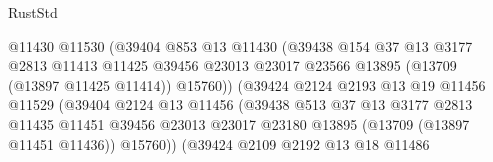 \begin{lexlean}{RustStd}
\begin{coremodule}
                                      @11430
                                      @11530
                                      (@39404
                                        @853
                                        @13
                                        @11430
                                        (@39438
                                          @154
                                          @37
                                          @13
                                          @3177
                                          @2813
                                          @11413
                                          @11425
                                          @39456
                                          @23013
                                          @23017
                                          @23566
                                          @13895
                                          (@13709 (@13897 @11425 @11414))
                                          @15760))
                                      (@39424
                                        @2124
                                        @2193
                                        @13
                                        @19
                                        @11456
                                        @11529
                                        (@39404
                                          @2124
                                          @13
                                          @11456
                                          (@39438
                                            @513
                                            @37
                                            @13
                                            @3177
                                            @2813
                                            @11435
                                            @11451
                                            @39456
                                            @23013
                                            @23017
                                            @23180
                                            @13895
                                            (@13709 (@13897 @11451 @11436))
                                            @15760))
                                        (@39424
                                          @2109
                                          @2192
                                          @13
                                          @18
                                          @11486

\end{coremodule}
\end{lexlean}
